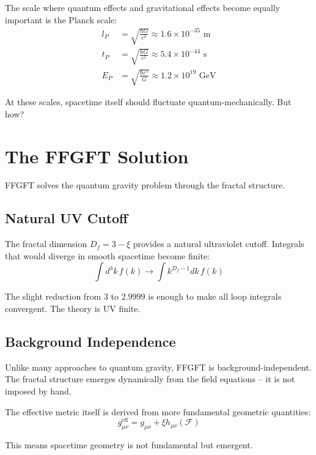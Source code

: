 	The scale where quantum effects and gravitational effects become equally important is the Planck scale:
	\[
	\begin{aligned}
		l_P &= \sqrt{\frac{\hbar G}{c^3}} \approx 1.6 \times 10^{-35}\text{ m} \\
		t_P &= \sqrt{\frac{\hbar G}{c^5}} \approx 5.4 \times 10^{-44}\text{ s} \\
		E_P &= \sqrt{\frac{\hbar c^5}{G}} \approx 1.2 \times 10^{19}\text{ GeV}
	\end{aligned}
	\]
	
	At these scales, spacetime itself should fluctuate quantum-mechanically. But how?
	
	\section{The FFGFT Solution}
	
	FFGFT solves the quantum gravity problem through the fractal structure.
	
	\subsection{Natural UV Cutoff}
	
	The fractal dimension $D_f = 3 - \xi$ provides a natural ultraviolet cutoff. Integrals that would diverge in smooth spacetime become finite:
	\begin{equation}
		\int d^3k \, f(k) \to \int k^{D_f-1} dk \, f(k)
	\end{equation}
	
	The slight reduction from 3 to $2.9999$ is enough to make all loop integrals convergent. The theory is UV finite.
	
	\subsection{Background Independence}
	
	Unlike many approaches to quantum gravity, FFGFT is background-independent. The fractal structure emerges dynamically from the field equations -- it is not imposed by hand.
	
	The effective metric itself is derived from more fundamental geometric quantities:
	\begin{equation}
		g_{\mu\nu}^{\text{eff}} = g_{\mu\nu} + \xi h_{\mu\nu}(\mathcal{F})
	\end{equation}
	
	This means spacetime geometry is not fundamental but emergent.
	
